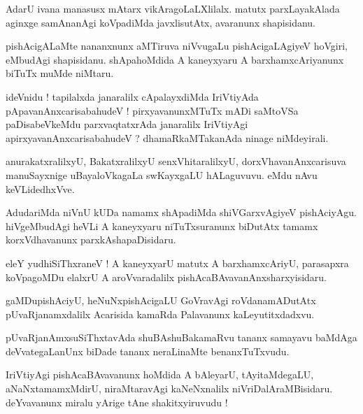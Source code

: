 \documentclass{article}
\begin{document}
\begin{mn}
AdarU ivana manasusx mAtarx vikAragoLaLXlilalx. matutx parxLayakAlada aginxge samAnanAgi
koVpadiMda javxlisutAtx, avaranunx shapisidanu.
\end{mn}

\begin{mn}
pishAcigALaMte nananxnunx aMTiruva niVvugaLu pishAcigaLAgiyeV hoVgiri, eMbudAgi shapisidanu.
shApahoMdida A kaneyxyaru A barxhamxcAriyanunx biTuTx muMde niMtaru.
\end{mn}

\begin{mn}
ideVnidu ! tapilalxda janaralilx cApalayxdiMda IriVtiyAda pApavanAnxcarisabahudeV ! 
pirxyavanunxMTuTx mADi saMtoVSa paDisabeVkeMdu parxvaqtatxrAda janaralilx IriVtiyAgi 
apirxyavanAnxcarisabahudeV ? dhamaRkaMTakanAda ninage niMdeyirali.
\end{mn}

\begin{mn}
anurakatxralilxyU, BakatxralilxyU senxVhitaralilxyU, dorxVhavanAnxcarisuva manuSayxnige 
uBayaloVkagaLa swKayxgaLU hALaguvuvu. eMdu nAvu keVLidedhxVve.
\end{mn}

\begin{mn}
AdudariMda niVnU kUDa namamx shApadiMda shiVGarxvAgiyeV pishAciyAgu. hiVgeMbudAgi heVLi A kaneyxyaru
niTuTxsuranunx biDutAtx tamamx korxVdhavanunx parxkAshapaDisidaru.
\end{mn}

\begin{mn}
eleY yudhiSiThxraneV ! A kaneyxyarU matutx A barxhamxcAriyU, parasapxra koVpagoMDu elalxrU A 
aroVvaradalilx pishAcaBAvavanAnxsharxyisidaru.
\end{mn}

\begin{mn}
gaMDupishAciyU, heNuNxpishAcigaLU GoVravAgi roVdanamADutAtx pUvaRjanamxdalilx Acarisida kamaRda 
Palavanunx kaLeyutitxdadxvu.
\end{mn}

\begin{mn}
pUvaRjanAmxsuSiThxtavAda shuBAshuBakamaRvu tananx samayavu baMdAga deVvategaLanUnx biDade tananx 
neraLinaMte benanxTuTxvudu.
\end{mn}

\begin{mn}
IriVtiyAgi pishAcaBAvavanunx hoMdida A bAleyarU, tAyitaMdegaLU, aNaNxtamamxMdirU, niraMtaravAgi 
kaNeNxnalilx  niVriDalAraMBisidaru. deYvavanunx miralu yArige tAne shakitxyiruvudu !
\end{mn}
\end{document}
